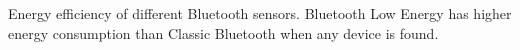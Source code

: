 Energy efficiency of different Bluetooth sensors. Bluetooth Low Energy has higher energy consumption than Classic Bluetooth when any device is found. 
